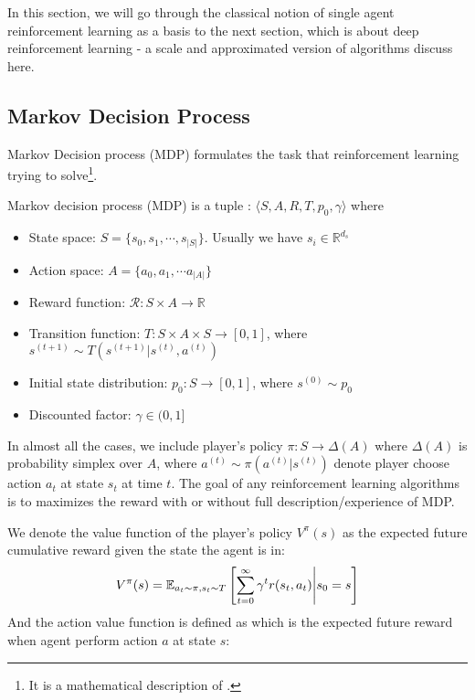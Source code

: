 \label{sec:chap2-single-rl}
In this section, we will go through the classical notion of single agent reinforcement learning as a basis to the next section, which is about deep reinforcement learning - a scale and approximated version of algorithms discuss here.

\subsection{Markov Decision Process}
\label{sec:chap2-rl-defintions}
Markov Decision process (MDP) formulates the task that reinforcement learning trying to solve\footnote{It is a mathematical description of .}. 
\begin{definition}
    Markov decision process (MDP) is a tuple : $\langle S, A, R, T, p_0, \gamma \rangle$ where 
    \begin{itemize}
        \item State space: $S = \{s_0, s_1, \cdots , s_{|S|}\}$. Usually we have $s_i \in \mathbb{R}^{d_s}$
        \item Action space: $A = \{a_0, a_1, \cdots a_{|A|}\}$
        \item Reward function: $\mathcal{R}: S \times A \rightarrow \mathbb{R}$
        \item Transition function: $T: S \times A \times S \rightarrow [0, 1]$, where $s^{(t+1)} \sim T(s^{(t+1)} | s^{(t)}, a^{(t)})$ 
        \item Initial state distribution: $p_0 : S \rightarrow [0, 1] $, where $s^{(0)} \sim p_0$
        \item Discounted factor: $\gamma \in (0, 1]$
    \end{itemize}
    In almost all the cases, we include player's policy $\pi: S \rightarrow \Delta(A)$ where $\Delta(A)$ is probability simplex over $A$, where $a^{(t)} \sim \pi(a^{(t)} | s^{(t)})$ denote player choose action $a_t$ at state $s_t$ at time $t$. The goal of any reinforcement learning algorithms is to maximizes the reward with or without full description/experience of MDP.
\end{definition}
\noindent
We denote the value function of the player's policy $V^\pi(s)$ as the expected future cumulative reward given the state the agent is in:
\begin{equation}
    V^\pi(s) = \mathbb{E}_{a_t \sim \pi, s_t \sim T}\left[ \sum^\infty_{t=0} \gamma^t r(s_t, a_t) \Bigg| s_0 = s \right]
\end{equation}
And the action value function is defined as which is the expected future reward when agent perform action $a$ at state $s$: 
